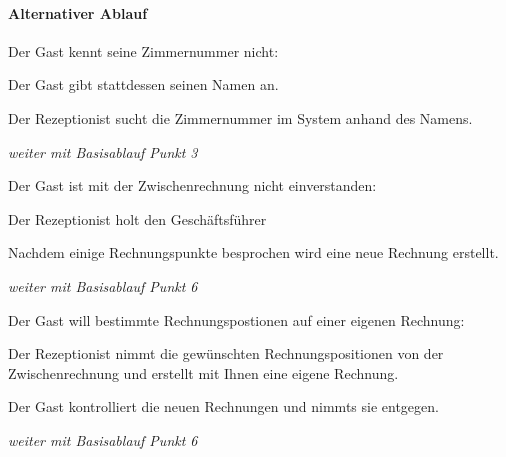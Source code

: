 \paragraph{Alternativer Ablauf}
\begin{longenum}
	\item
	\begin{longenum}
		\item Der \Gls{Gast} kennt seine \Gls{Zimmernummer} nicht:
		\begin{longenum}
			\item Der \Gls{Gast} gibt stattdessen seinen Namen an.
			\item Der \Gls{Rezeptionist} sucht die \Gls{Zimmernummer} im System anhand des	Namens.
			\item \emph{weiter mit Basisablauf Punkt 3}
		\end{longenum}
	\end{longenum}
	\item
	\item
	\item
	\item
	\begin{longenum}
		\item Der \Gls{Gast} ist mit der \Gls{Zwischenrechnung} nicht einverstanden:
		\begin{longenum}
			\item Der \Gls{Rezeptionist} holt den Geschäftsführer
			\item Nachdem einige Rechnungspunkte besprochen wird eine neue Rechnung
			erstellt.
			\item \emph{weiter mit Basisablauf Punkt 6}
		\end{longenum}
	\end{longenum}
	\begin{longenum}
	\item Der \Gls{Gast} will bestimmte Rechnungspostionen auf einer eigenen
	\Gls{Rechnung}:
		\begin{longenum}
			\item Der \Gls{Rezeptionist} nimmt die gewünschten Rechnungspositionen von
			der \Gls{Zwischenrechnung} und erstellt mit Ihnen eine eigene \Gls{Rechnung}.
			\item Der \Gls{Gast} kontrolliert die neuen \Gls{Rechnung}en und nimmts sie
			entgegen.
			\item \emph{weiter mit Basisablauf Punkt 6}
		\end{longenum}
	\end{longenum}
	\begin{longenum}

\end{longenum}
\end{longenum}
